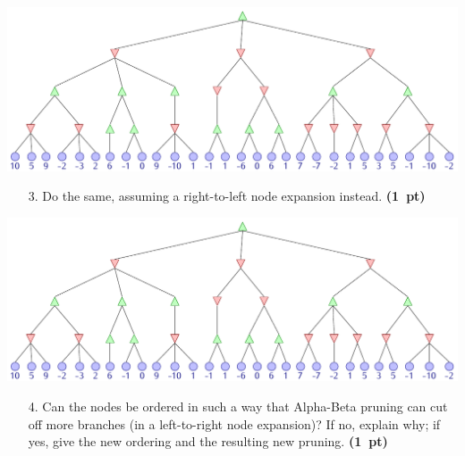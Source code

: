 \documentclass[11pt,a4paper]{report}
\begin{document}
\begin{answers}[8cm]
\includegraphics[scale=.85]{minimax.pdf}
\end{answers}





\begin{enumerate}
\item[3.] Do the same, assuming a right-to-left node expansion instead.  \textbf{(1~pt)}
\end{enumerate}

\begin{answers}[8cm]
\includegraphics[scale=.85]{minimax.pdf}
\end{answers}




\clearpage
\begin{enumerate}
\item[4.] Can the nodes be ordered in such a way that Alpha-Beta pruning can cut off
      more branches (in a left-to-right node expansion)? If no, explain why; if
      yes, give the new ordering and the resulting new pruning. \textbf{(1~pt)}
\end{enumerate}

\begin{answers}[8cm]
\end{answers}
\end{document}
